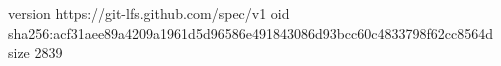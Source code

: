 version https://git-lfs.github.com/spec/v1
oid sha256:acf31aee89a4209a1961d5d96586e491843086d93bcc60c4833798f62cc8564d
size 2839

